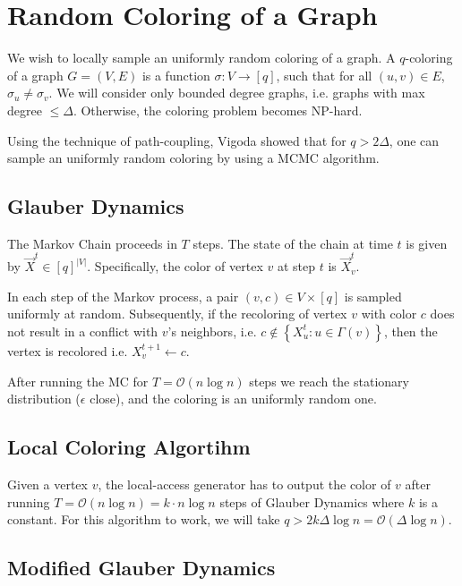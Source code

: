 \section{Random Coloring of a Graph}%
\label{sec:random_coloring_of_a_graph}

We wish to locally sample an uniformly random coloring of a graph.
A $q$-coloring of a graph $G = (V, E)$ is a function $\sigma : V\rightarrow [q]$,
such that for all $(u,v)\in E$, $\sigma_u \not= \sigma_v$.
We will consider only bounded degree graphs, i.e. graphs with max degree $\le \Delta$.
Otherwise, the coloring problem becomes NP-hard.

Using the technique of path-coupling, Vigoda  showed that for $q > 2\Delta$,
one can sample an uniformly random coloring by using a MCMC algorithm.

\subsection{Glauber Dynamics}%
\label{sub:glauber_dynamics}

The Markov Chain proceeds in $T$ steps. The state of the chain at time $t$ is given by $\vec X^t\in [q]^{|V|}$.
Specifically, the color of vertex $v$ at step $t$ is $\vec X^t_v$.

In each step of the Markov process, a pair $(v, c)\in V\times [q]$ is sampled uniformly at random.
Subsequently, if the recoloring of vertex $v$ with color $c$ does not result in a conflict with $v$'s neighbors,
i.e. $c\not\in \left\{ X^t_u : u\in \Gamma(v)\right\}$, then the vertex is recolored i.e. $X_v^{t+1}\leftarrow c$.

After running the MC for $T = \mathcal{O}(n\log n)$ steps we reach the stationary distribution ($\epsilon$ close),
and the coloring is an uniformly random one.

\subsection{Local Coloring Algortihm}%
\label{sub:local_coloring_algortihm}

Given a vertex $v$, the local-access generator has to output the color of $v$
after running $T = \mathcal{O}(n\log n) = k\cdot n\log n$ steps of Glauber Dynamics where $k$ is a constant.
For this algorithm to work, we will take $q > 2k\Delta\log n = \mathcal{O}(\Delta\log n)$.

\subsection{Modified Glauber Dynamics}%
\label{sub:modified_glauber_dynamics}

